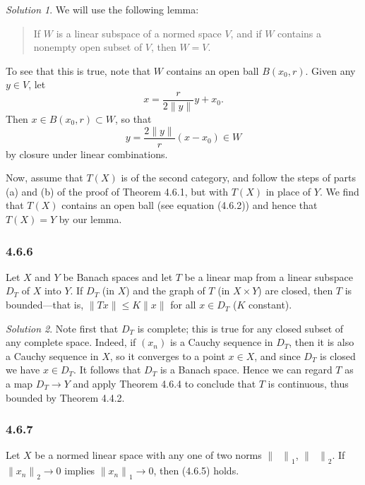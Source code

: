 \documentclass{report}
\newcommand{\norm}[1]{{\lVert #1 \rVert}}
\theoremstyle{remark}
\newtheorem*{solution}{Solution}
\begin{document}
\begin{solution}
  We will use the following lemma:
  \begin{quote}
    If $W$ is a linear subspace of a normed space $V$, and if $W$ contains a nonempty open subset of $V$, then $W = V$.
  \end{quote}
  To see that this is true, note that $W$ contains an open ball $B(x_0,r)$. Given any $y \in V$, let
  \begin{equation*}
    x = \frac{r}{2 \norm y} y + x_0.
  \end{equation*}
  Then $x \in B(x_0,r) \subset W$, so that
  \begin{equation*}
    y = \frac{2 \norm y}{r} (x - x_0) \in W
  \end{equation*}
  by closure under linear combinations.

  Now, assume that $T(X)$ is of the second category, and follow the steps of parts (a) and (b) of the proof of Theorem 4.6.1, but with $T(X)$ in place of $Y$. We find that $T(X)$ contains an open ball (see equation (4.6.2)) and hence that $T(X) = Y$ by our lemma.
\end{solution}

\subsubsection*{4.6.6}
Let $X$ and $Y$ be Banach spaces and let $T$ be a linear map from a linear subspace $D_T$ of $X$ into $Y$. If $D_T$ (in $X$) and the graph of $T$ (in $X \times Y$) are closed, then $T$ is bounded---that is, $\norm{Tx} \le K \norm x$ for all $x \in D_T$ ($K$ constant).

\begin{solution}
  Note first that $D_T$ is complete; this is true for any closed subset of any complete space. Indeed, if $(x_n)$ is a Cauchy sequence in $D_T$, then it is also a Cauchy sequence in $X$, so it converges to a point $x \in X$, and since $D_T$ is closed we have $x \in D_T$. It follows that $D_T$ is a Banach space. Hence we can regard $T$ as a map $D_T \to Y$ and apply Theorem 4.6.4 to conclude that $T$ is continuous, thus bounded by Theorem 4.4.2.
\end{solution}

\subsubsection*{4.6.7}
Let $X$ be a normed linear space with any one of two norms $\norm{\phantom x}_1$, $\norm{\phantom x}_2$. If $\norm{x_n}_2 \to 0$ implies $\norm{x_n}_1 \to 0$, then (4.6.5) holds.
\end{document}
